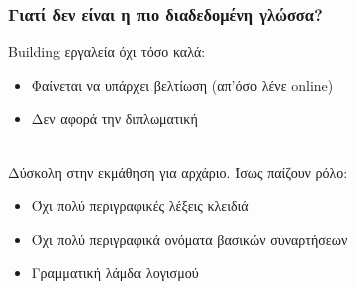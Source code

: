 \documentclass{beamer}
\def\e{\foreignlanguage{english}}
\begin{document}
\begin{frame}

\frametitle{Γιατί δεν είναι η πιο διαδεδομένη γλώσσα?}

\e{Building} εργαλεία όχι τόσο καλά:

\begin{itemize}

\item Φαίνεται να υπάρχει βελτίωση (απ'όσο λένε \e{online})

\item Δεν αφορά την διπλωματική
\\~\

\end{itemize}

\pause

Δύσκολη στην εκμάθηση για αρχάριο. Ίσως παίζουν ρόλο:

\begin{itemize}

\item Όχι πολύ περιγραφικές λέξεις κλειδιά

\item Όχι πολύ περιγραφικά ονόματα βασικών συναρτήσεων

\item Γραμματική λάμδα λογισμού

\end{itemize}

\end{frame}
\end{document}
